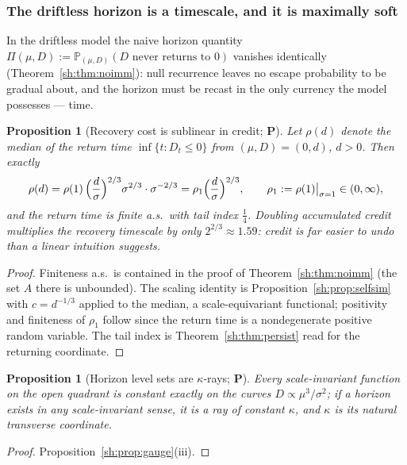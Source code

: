 \documentclass[11pt]{article}
\numberwithin{equation}{section}
\theoremstyle{plain}
\newtheorem{proposition}[theorem]{Proposition}
\theoremstyle{definition}
\theoremstyle{remark}
\newcommand{\PP}{\mathbb{P}}
\begin{document}
\subsubsection{The driftless horizon is a timescale, and it is maximally
soft}\label{sh:subsub:softhorizon}

In the driftless model the naive horizon quantity
$\Pi(\mu,D):=\PP_{(\mu,D)}(D\text{ never returns to }0)$ vanishes
identically (Theorem~\ref{sh:thm:noimm}): null recurrence leaves no escape
probability to be gradual about, and the horizon must be recast in the only
currency the model possesses --- time.

\begin{proposition}[Recovery cost is sublinear in credit; \textbf{P}]
\label{sh:prop:recovery}
Let $\rho(d)$ denote the median of the return time
$\inf\{t:D_t\le0\}$ from $(\mu,D)=(0,d)$, $d>0$. Then exactly
\begin{equation}\label{sh:eq:recovery}
\rho(d)=\rho(1)\,\Bigl(\frac d\sigma\Bigr)^{2/3}\sigma^{2/3}\cdot
\sigma^{-2/3}=\rho_1\Bigl(\frac d\sigma\Bigr)^{2/3},
\qquad \rho_1:=\rho(1)\big|_{\sigma=1}\in(0,\infty),
\end{equation}
and the return time is finite a.s.\ with tail index $\tfrac14$. Doubling
accumulated credit multiplies the recovery timescale by only
$2^{2/3}\approx1.59$: credit is far easier to undo than a linear intuition
suggests.
\end{proposition}

\begin{proof}
Finiteness a.s.\ is contained in the proof of
Theorem~\ref{sh:thm:noimm} (the set $A$ there is unbounded). The scaling
identity is Proposition~\ref{sh:prop:selfsim} with $c=d^{-1/3}$ applied to
the median, a scale-equivariant functional; positivity and finiteness of
$\rho_1$ follow since the return time is a nondegenerate positive random
variable. The tail index is Theorem~\ref{sh:thm:persist} read for the
returning coordinate.
\end{proof}

\begin{proposition}[Horizon level sets are $\kappa$-rays; \textbf{P}]
\label{sh:prop:rays}
Every scale-invariant function on the open quadrant is constant exactly on
the curves $D\propto\mu^3/\sigma^2$; if a horizon exists in any
scale-invariant sense, it is a ray of constant $\kappa$, and $\kappa$ is
its natural transverse coordinate.
\end{proposition}

\begin{proof}
Proposition~\ref{sh:prop:gauge}(iii).
\end{proof}
\end{document}
